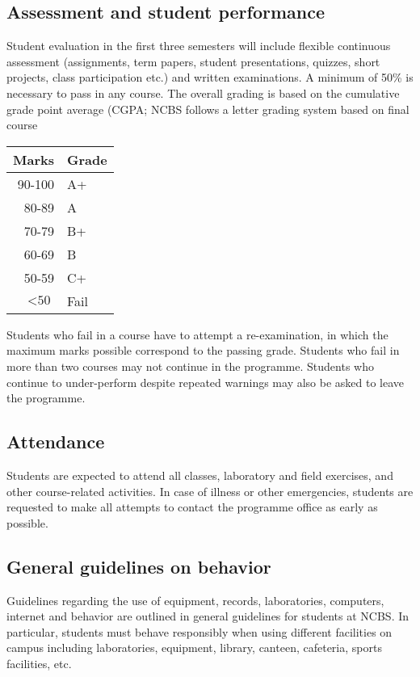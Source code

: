 \documentclass[a4paper,10pt]{article}
\begin{document}
\subsection{Assessment and student performance}
Student evaluation in the first three semesters will
include flexible continuous assessment (assignments, term papers, student presentations,
quizzes, short projects, class participation etc.) and written examinations. A minimum of
50\% is necessary to pass in any course. The overall grading is based on the cumulative
grade point average (CGPA; NCBS follows a letter grading system based on final course

\begin{table}[ht!]
    \begin{tabular}{r l}
        \toprule
        Marks & Grade \\
        \midrule
        90-100 & A+ \\
        80-89 & A \\
        70-79 & B+ \\
        60-69 & B \\
        50-59 & C+ \\
        $< \text{50}$  & Fail \\
        \bottomrule
    \end{tabular} 
    \label{table:grading_scheme}
\end{table}

Students who fail in a course have to attempt a re-examination, in which the maximum
marks possible correspond to the passing grade. Students who fail in more than two courses
may not continue in the programme. Students who continue to under-perform despite
repeated warnings may also be asked to leave the programme.

\subsection{Attendance} Students are expected to attend all classes, laboratory
and field exercises, and other course-related activities. In case of illness or
other emergencies, students are requested to make all attempts to contact the
programme office as early as possible.

\subsection{General guidelines on behavior} Guidelines regarding the use of
equipment, records, laboratories, computers, internet and behavior are outlined
in general guidelines for students at NCBS. In particular, students must behave
responsibly when using different facilities on campus including laboratories,
equipment, library, canteen, cafeteria, sports facilities, etc.
\end{document}
